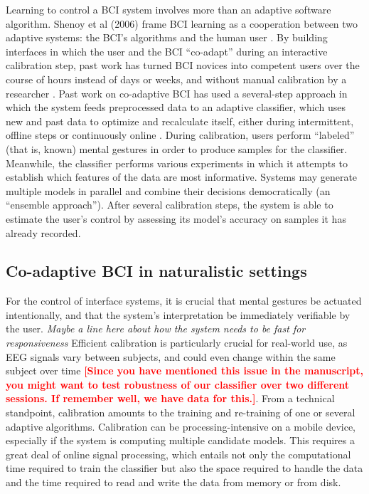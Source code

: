 Learning to control a BCI system involves more than an adaptive software algorithm. Shenoy et al (2006) frame BCI learning as a cooperation between two adaptive systems: the BCI's algorithms and the human user \cite{shenoy_towards_2006}.  By building interfaces in which the user and the BCI ``co-adapt'' during an interactive calibration step, past work has turned BCI novices into competent users over the course of hours instead of days or weeks, and without manual calibration by a researcher \cite{vidaurre_fully_2006,vidaurre_co-adaptive_2011,vidaurre_machine-learning-based_2011}. 
Past work on co-adaptive BCI has used a several-step approach in which the system feeds preprocessed data to an adaptive classifier, which uses new and past data to optimize and recalculate itself, either during intermittent, offline steps or continuously online \cite{vidaurre_fully_2006,shijian_lu_unsupervised_2009,das_unsupervised_2013}. During calibration, users perform ``labeled'' (that is, known) mental gestures in order to produce samples for the classifier. Meanwhile, the classifier performs various experiments in which it attempts to establish which features of the data are most informative. Systems may generate multiple models in parallel and combine their decisions democratically (an ``ensemble approach''). After several calibration steps, the system is able to estimate the user's control by assessing its model's accuracy on samples it has already recorded.

\subsection{Co-adaptive BCI in naturalistic settings}

For the control of interface systems, it is crucial that mental gestures be actuated intentionally, and that the system's interpretation be immediately verifiable by the user. \cite{mcfarland_brain-computer_2011,ali_empirical_2014} \textit{Maybe a line here about how the system needs to be fast for responsiveness} Efficient calibration is particularly crucial for real-world use, as EEG signals vary between subjects, and could even change within the same subject over time \textcolor{red}{\bf [Since you have mentioned this issue in the manuscript, you might want to test robustness of our classifier over two different sessions. If remember well, we have data for this.]}. From a technical standpoint, calibration amounts to the training and re-training of one or several adaptive algorithms. Calibration can be processing-intensive on a mobile device, especially if the system is computing multiple candidate models. This requires a great deal of online signal processing, which entails not only the computational time required to train the classifier but also the space required to handle the data and the time required to read and write the data from memory or from disk.




